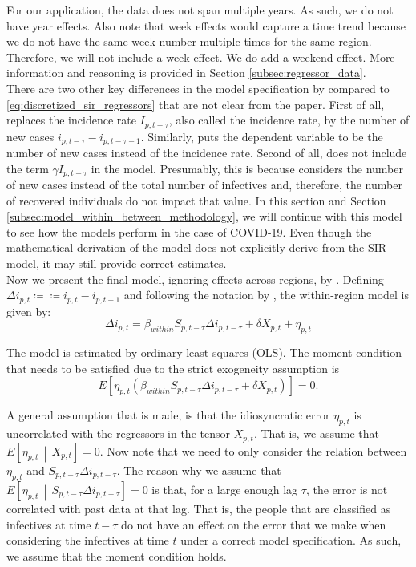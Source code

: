 \documentclass[12pt]{article}
\begin{document}
	For our application, the data does not span multiple years. As such, we do not have year effects. Also note that week effects would capture a time trend because we do not have the same week number multiple times for the same region. Therefore, we will not include a week effect. We do add a weekend effect. More information and reasoning is provided in Section \ref{subsec:regressor_data}. \\
	
	There are two other key differences in the model specification by \textcite{adda2016economic} compared to \eqref{eq:discretized_sir_regressors} that are not clear from the paper. First of all, \textcite{adda2016economic} replaces the incidence rate $I_{p,t-\tau}$, also called the incidence rate, by the number of new cases $i_{p,t-\tau} - i_{p,t-\tau-1}$. Similarly, \textcite{adda2016economic} puts the dependent variable to be the number of new cases instead of the incidence rate. Second of all, \textcite{adda2016economic} does not include the term $\gamma I_{p,t-\tau}$ in the model. Presumably, this is because \textcite{adda2016economic} considers the number of new cases instead of the total number of infectives and, therefore, the number of recovered individuals do not impact that value. In this section and Section \ref{subsec:model_within_between_methodology}, we will continue with this model to see how the models perform in the case of COVID-19. Even though the mathematical derivation of the model does not explicitly derive from the SIR model, it may still provide correct estimates. \\
	
	Now we present the final model, ignoring effects across regions, by \textcite{adda2016economic}. Defining $\Delta i_{p,t} \coloneqq  \coloneqq i_{p,t} - i_{p,t-1}$ and following the notation by \textcite{keeling2011modeling}, the within-region model is given by:
	\begin{equation} \label{eq:model_within}
	    \Delta i_{p,t} = \beta_{within}S_{p,t-\tau}\Delta i_{p,t-\tau} + \delta X_{p,t} + \eta_{p,t}
	\end{equation}
	
	The model is estimated by ordinary least squares (OLS). The moment condition that needs to be satisfied due to the strict exogeneity assumption is
	    \[E\left[ \eta_{p,t} \left( \beta_{within}S_{p,t-\tau}\Delta i_{p,t-\tau} + \delta X_{p,t} \right) \right] = 0.\]
	
	A general assumption that is made, is that the idiosyncratic error $\eta_{p,t}$ is uncorrelated with the regressors in the tensor $X_{p,t}$. That is, we assume that $E\left[\eta_{p,t} \,\middle|\, X_{p,t}\right] = 0$. Now note that we need to only consider the relation between $\eta_{p,t}$ and $S_{p,t-\tau}\Delta i_{p,t-\tau}$. The reason why we assume that $E\left[\eta_{p,t} \,\middle|\, S_{p,t-\tau}\Delta i_{p,t-\tau}\right] = 0$ is that, for a large enough lag $\tau$, the error is not correlated with past data at that lag. That is, the people that are classified as infectives at time $t-\tau$ do not have an effect on the error that we make when considering the infectives at time $t$ under a correct model specification. As such, we assume that the moment condition holds. \\
	
\end{document}
